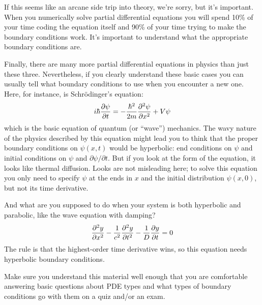 If this seems like an arcane side trip into theory, we're sorry, but
it's important. When you numerically solve partial differential
equations you will spend 10\% of your time coding the equation
itself and 90\% of your time trying to make the boundary conditions
work. It's important to understand what the appropriate boundary
conditions are.

Finally, there are many more partial differential equations in
physics than just these three. Nevertheless, if you clearly
understand these basic cases you can usually tell what boundary
conditions to use when you encounter a new one.  Here, for instance, is Schr\"{o}dinger's equation:
\begin{equation}
    i \hbar {\partial \psi \over \partial t} = -{\hbar^2 \over 2 m}
    {\partial^2 \psi \over \partial x^2} + V \psi
\end{equation}
which is the basic equation of quantum (or ``wave'') mechanics. The
wavy nature of the physics described by this equation might lead you
to think that the proper boundary conditions on $\psi(x,t)$ would be
hyperbolic: end conditions on $\psi$ and initial conditions on
$\psi$ and $\partial \psi / \partial t$. But if you look at the form
of the equation, it looks like thermal diffusion. Looks are not
misleading here; to solve this equation you only need to specify
$\psi$ at the ends in $x$ and the initial distribution $\psi(x,0)$,
but not its time derivative.

And what are you supposed to do when your system is both hyperbolic
and parabolic, like the wave equation with damping?
\begin{equation}
    {\partial^2 y \over \partial x^2} - {1 \over c^2}
    {\partial^2 y \over \partial t^2} -
    {1 \over D} {\partial y \over \partial t}=0
\end{equation}
The rule is that the highest-order time derivative wins, so this
equation needs hyperbolic boundary conditions.

\begin{enumerate}
    \prob Make sure you understand this material well
    enough that you are comfortable answering basic
    questions about PDE types and what types of boundary
    conditions go with them on a quiz and/or an exam.
\end{enumerate}
